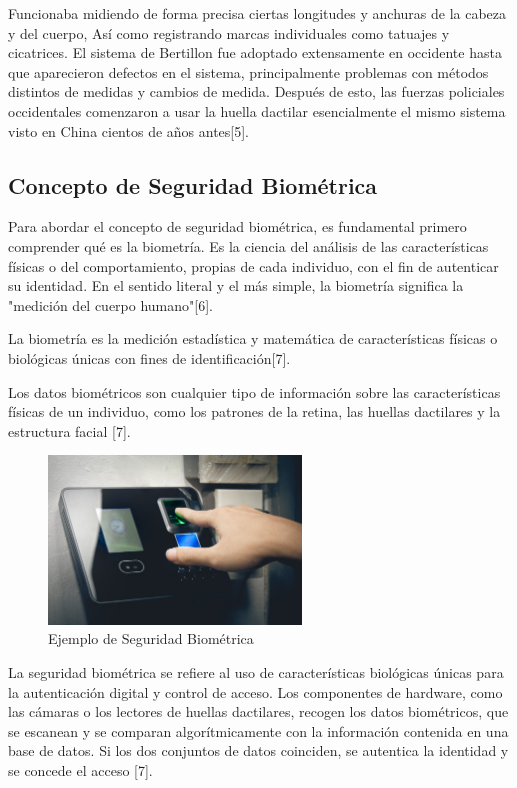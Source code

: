 Funcionaba midiendo de forma precisa ciertas longitudes y anchuras de la
cabeza y del cuerpo, Así como registrando marcas individuales como tatuajes
y cicatrices. El sistema de Bertillon fue adoptado extensamente en occidente
hasta que aparecieron defectos en el sistema, principalmente problemas con
métodos distintos de medidas y cambios de medida. Después de esto, las fuerzas
policiales occidentales comenzaron a usar la huella dactilar esencialmente el
mismo sistema visto en China cientos de años antes[5].


\subsection{Concepto de Seguridad Biométrica}

Para abordar el concepto de seguridad biométrica, es fundamental primero comprender qué es la biometría. Es la ciencia del análisis de las características
físicas o del comportamiento, propias de cada individuo, con el fin de autenticar su identidad. En el sentido literal y el más simple, la biometría significa la
"medición del cuerpo humano"[6].

La biometría es la medición estadística y matemática de características
físicas o biológicas únicas con fines de identificación[7].


Los datos biométricos son cualquier tipo de información sobre las características físicas de un individuo, como los patrones de la retina, las huellas
dactilares y la estructura facial [7].



\begin{figure}[H]
  \centering
  \includegraphics[width=0.6\textwidth]{imagenes_doc/segu_biometrica_1.jpg}
  \caption{Ejemplo de Seguridad Biométrica}
  \label{fig:logo}
\end{figure}

La seguridad biométrica se refiere al uso de características biológicas únicas para la autenticación digital y control de acceso. Los componentes de
hardware, como las cámaras o los lectores de huellas dactilares, recogen los
datos biométricos, que se escanean y se comparan algorítmicamente con la
información contenida en una base de datos. Si los dos conjuntos de datos
coinciden, se autentica la identidad y se concede el acceso [7].



